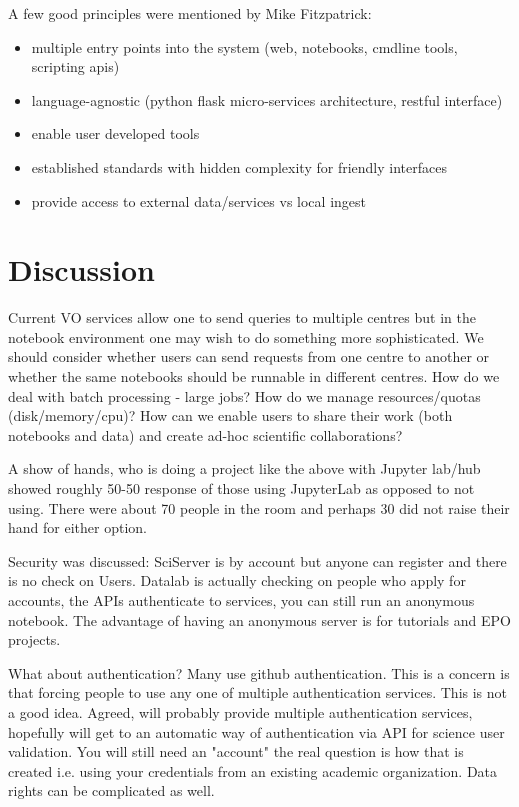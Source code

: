 \documentclass[11pt,twoside]{article}
\begin{document}
A few good principles were mentioned by Mike Fitzpatrick:
\begin{itemize}
\item multiple entry points into the system (web, notebooks, cmdline tools, scripting apis)
\item language-agnostic (python flask micro-services architecture, restful interface)
\item  enable user developed tools
\item  established standards with hidden complexity for friendly interfaces
\item  provide access to external data/services vs local ingest
\end{itemize}


\section{Discussion}
Current VO services allow one to send queries to multiple centres but in the notebook environment one may wish to do something more sophisticated. We should consider whether users can send requests from one centre to another or whether the same notebooks should be runnable in different centres.
How do we deal with batch processing - large jobs? How do we manage resources/quotas (disk/memory/cpu)?  How can we enable users to share their work (both notebooks and data) and create ad-hoc scientific collaborations?

A show of hands, who is doing a project like the above with Jupyter lab/hub showed roughly 50-50 response of those using JupyterLab as opposed to not using. There were about 70 people in the room and perhaps 30 did not raise their hand for either option.

Security was discussed:
SciServer is by account but anyone can register and there is no check on Users.
Datalab is actually checking on people who apply for accounts, the APIs authenticate to services, you can still run an anonymous notebook. The advantage of having an anonymous server is for tutorials and EPO projects.

What about  authentication? Many use github authentication. This is a concern is that forcing people to use any one of multiple authentication services. This is not a good idea.
Agreed, will probably provide multiple authentication services, hopefully will get to an automatic way of authentication via API for science user validation. You will still need an "account" the real question is how that is created i.e. using your credentials from an existing academic organization.  Data rights can be complicated as well.
\end{document}
